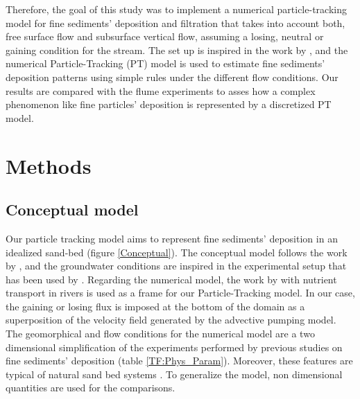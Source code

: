 \documentclass[draft,linenumbers]{agujournal2018}
\begin{document}
Therefore, the goal of this study was to implement a numerical particle-tracking model for fine sediments' deposition and filtration that takes into account both, free surface flow and subsurface vertical flow, assuming a losing, neutral or gaining condition for the stream. The set up is inspired in the work by \citet{Fox2014,Fox2018}, and the numerical Particle-Tracking (PT) model is used to estimate fine sediments' deposition patterns using simple rules under the different flow conditions. Our results are compared with the flume experiments to asses how a complex phenomenon like fine particles' deposition is represented by a discretized PT model. 

\section{Methods} \label{Methods}

\subsection{Conceptual model} \label{Conceptual_Model}

Our particle tracking model aims to represent fine sediments' deposition in an idealized sand-bed (figure \ref{Conceptual}). The conceptual model follows the work by \citet{Elliott1997,Elliott1997b,Packman2000,Packman2000a}, and the groundwater conditions are inspired in the experimental setup that has been used by \citet{Fox2014,Fox2018}. Regarding the numerical model, the work by \citet{Li2017} with nutrient transport in rivers is used as a frame for our Particle-Tracking model. In our case, the gaining or losing flux is imposed at the bottom of the domain as a superposition of the velocity field generated by the advective pumping model. The geomorphical and flow conditions for the numerical model are a two dimensional simplification of the experiments performed by previous studies on fine sediments' deposition \citep{Packman2000,Fox2014,Fox2018}(table \ref{TF:Phys_Param}). Moreover, these features are typical of natural sand bed systems \citep{Vanoni1974,Harvey2012,Worman2007,Hunken2007,Mutz2000,Mutz2003}. To generalize the model, non dimensional quantities are used for the comparisons.
\end{document}
